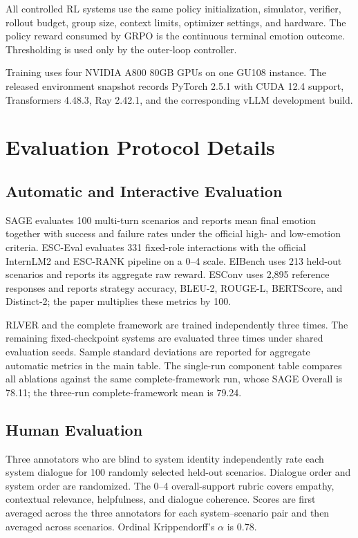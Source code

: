 All controlled RL systems use the same policy initialization, simulator,
verifier, rollout budget, group size, context limits, optimizer settings, and
hardware. The policy reward consumed by GRPO is the continuous terminal emotion
outcome. Thresholding is used only by the outer-loop controller.

Training uses four NVIDIA A800 80GB GPUs on one GU108 instance. The released
environment snapshot records PyTorch 2.5.1 with CUDA 12.4 support,
Transformers 4.48.3, Ray 2.42.1, and the corresponding vLLM development build.

\section{Evaluation Protocol Details}
\subsection{Automatic and Interactive Evaluation}
SAGE evaluates 100 multi-turn scenarios and reports mean final emotion together
with success and failure rates under the official high- and low-emotion
criteria. ESC-Eval evaluates 331 fixed-role interactions with the official
InternLM2 and ESC-RANK pipeline on a 0--4 scale. EIBench uses 213 held-out
scenarios and reports its aggregate raw reward. ESConv uses 2,895 reference
responses and reports strategy accuracy, BLEU-2, ROUGE-L, BERTScore, and
Distinct-2; the paper multiplies these metrics by 100.

RLVER and the complete framework are trained independently three times. The
remaining fixed-checkpoint systems are evaluated three times under shared
evaluation seeds. Sample standard deviations are reported for aggregate
automatic metrics in the main table. The single-run component table compares
all ablations against the same complete-framework run, whose SAGE Overall is
78.11; the three-run complete-framework mean is 79.24.

\subsection{Human Evaluation}
Three annotators who are blind to system identity independently rate each
system dialogue for 100 randomly selected held-out scenarios. Dialogue order
and system order are randomized. The 0--4 overall-support rubric covers empathy,
contextual relevance, helpfulness, and dialogue coherence. Scores are first
averaged across the three annotators for each system--scenario pair and then
averaged across scenarios. Ordinal Krippendorff's $\alpha$ is 0.78.

